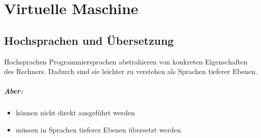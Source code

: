\documentclass[12pt]{report}
\begin{document}


\chapter{Virtuelle Maschine}

\section{Hochsprachen und Übersetzung}
\begin{defbox}
  Hochsprachen Programmiersprachen abstrahieren von konkreten Eigenschaften des Rechners.
  Dadurch sind sie leichter zu verstehen als Sprachen tieferer Ebenen.
  \paragraph{Aber:}
  \begin{itemize}
    \item können nicht direkt ausgeführt werden
    \item müssen in Sprachen tieferer Ebenen übersetzt werden
  \end{itemize}
\end{defbox}
\end{document}
